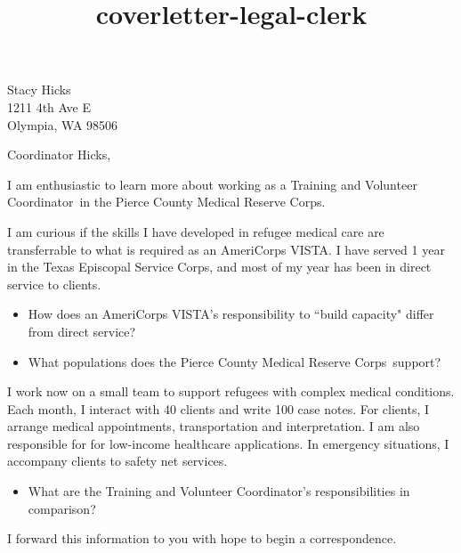 \documentclass{letter}
\title{coverletter-legal-clerk}
\newcommand{\jobtitle}{Training and Volunteer Coordinator}
\newcommand{\company}{Pierce County Medical Reserve Corps}
\begin{document}
\begin{letter}{Stacy Hicks\\
1211 4th Ave E\\
Olympia, WA 98506}
\opening{Coordinator Hicks,}

I am enthusiastic to learn more about working as a \jobtitle\ in the \company. 

I am curious if the skills I have developed in refugee medical care are transferrable to what is required as an AmeriCorps VISTA. I have served 1 year in the Texas Episcopal Service Corps, and most of my year has been in direct service to clients. 

\begin{itemize}
\item How does an AmeriCorps VISTA's responsibility to ``build capacity" differ from direct service? 
\item What populations does the \company\ support?
\end{itemize}

I work now on a small team to support refugees with complex medical conditions. 
Each month, I interact with 40 clients and write 100 case notes. For clients, I arrange medical appointments, transportation and interpretation. I am also responsible for for low-income healthcare applications. In emergency situations, I accompany clients to safety net services. %
\begin{itemize}
\item What are the \jobtitle's responsibilities in comparison?
\end{itemize}
I forward this information to you with hope to begin a correspondence.


\end{letter}
\end{document}
